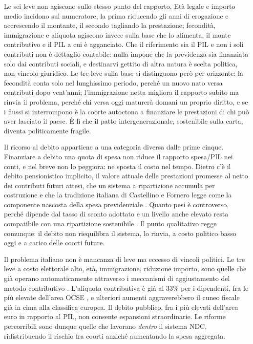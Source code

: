 \noindent
Le sei leve non agiscono sullo stesso punto del rapporto. Età legale e importo
medio incidono sul numeratore, la prima riducendo gli anni di erogazione e
accrescendo il montante, il secondo tagliando la prestazione; fecondità,
immigrazione e aliquota agiscono invece sulla base che lo alimenta, il monte
contributivo e il PIL a cui è agganciato. Che il riferimento sia il PIL e non i
soli contributi non è dettaglio contabile: nulla impone che la previdenza sia
finanziata solo dai contributi sociali, e destinarvi gettito di altra natura è
scelta politica, non vincolo giuridico. Le tre leve sulla base si distinguono però
per orizzonte: la fecondità conta solo nel lunghissimo periodo, perché un nuovo
nato versa contributi dopo vent'anni; l'immigrazione netta migliora il rapporto
subito ma rinvia il problema, perché chi versa oggi maturerà domani un proprio
diritto, e se i flussi si interrompono è la coorte autoctona a finanziare le
prestazioni di chi può aver lasciato il paese. È lì che il patto
intergenerazionale, sostenibile sulla carta, diventa politicamente fragile.

\medskip
\noindent
Il ricorso al debito appartiene a una categoria diversa dalle prime cinque.
Finanziare a debito una quota di spesa non riduce il rapporto spesa/PIL nei conti,
e nel breve non lo peggiora: ne sposta il costo nel tempo. Dietro c'è il debito
pensionistico implicito, il valore attuale delle prestazioni promesse al netto dei
contributi futuri attesi, che un sistema a ripartizione accumula per costruzione e
che la tradizione italiana di Castellino e Fornero legge come la componente
nascosta della spesa previdenziale \cite{FrancoMarinoZotteri2004,
CastellinoFornero1997, Fornero2018}. Quanto pesi è controverso, perché dipende dal
tasso di sconto adottato e un livello anche elevato resta compatibile con una
ripartizione sostenibile \cite{FrancoMarinoZotteri2004, BeltramettiDellaValle2011}.
Il punto qualitativo regge comunque: il debito non riequilibra il sistema, lo
rinvia, a costo politico basso oggi e a carico delle coorti future.

\medskip
\noindent
Il problema italiano non è mancanza di leve ma eccesso di vincoli politici. Le tre leve a costo
elettorale alto, età, immigrazione, riduzione importo, sono quelle che già
operano automaticamente attraverso i meccanismi di aggiustamento del metodo
contributivo \cite{MEF_RGS2025_NdA}. L'aliquota contributiva è già al 33\%
per i dipendenti, fra le più elevate dell'area OCSE \cite{OCPI2026,
BosiGuerra2022}, e ulteriori aumenti aggraverebbero il cuneo fiscale già in
cima alla classifica europea. Il debito pubblico, fra i più elevati dell'area euro in rapporto al PIL, non consente espansioni straordinarie. Le riforme percorribili sono
dunque quelle che lavorano \emph{dentro} il sistema NDC, ridistribuendo il
rischio fra coorti anziché aumentando la spesa aggregata.

